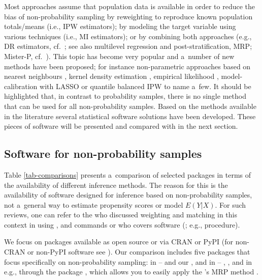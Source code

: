 \documentclass[
]{jss}
\begin{document}
Most approaches assume that population data is available in order to
reduce the bias of non-probability sampling by reweighting to reproduce
known population totals/means (i.e., IPW estimators); by modeling the
target variable using various techniques (i.e., MI estimators); or by
combining both approaches (e.g., DR estimators,
cf.~\citet{chen2020doubly}; see also multilevel regression and
post-stratification, MRP; Mister-P,
cf.~\citet{gelman1997poststratification}). This topic has become very
popular and a~number of new methods have been proposed; for instance
non-parametric approaches based on nearest neighbours
\citep{yang2021integration}, kernel density estimation
\citep{chen_nonparametric_2022}, empirical likelihood
\citep{kim2023empirical}, model-calibration with LASSO \citep{chen2018}
or quantile balanced IPW \citep{beresewicz2025} to name a~few. It should
be highlighted that, in contrast to probability samples, there is no
single method that can be used for all non-probability samples. Based on
the methods available in the literature several statistical software
solutions have been developed. These pieces of software will be
presented and compared with  \citep{nonprobsvy} in the
next section.

\subsection{Software for non-probability samples}\label{sec-software}

Table \ref{tab-comparisons} presents a~comparison of selected packages
in terms of the availability of different inference methods. The reason
for this is the availability of software designed for inference based on
non-probability samples, not a~general way to estimate propensity scores
or model \(E(Y|X)\). For such reviews, one can refer to the
\citet[Chapter 6]{valliant2018survey} who discussed weighting and
matching in this context in  \citep{Stata2025} using
,  and  commands or
\citet[e.g., Chapter 8]{lohr2021sas} who covers  software
(\citet{sas94}; e.g.,  procedure).

We focus on packages available as open source or via CRAN or PyPI (for
non-CRAN or non-PyPI software see \citet{cobo2024software}). Our
comparison includes five packages that focus specifically on
non-probability sampling: in  -- 
\citep{NonProbEst} and our , and in  --
 \citep{sarig2023balancepythonpackage}, 
\citep{castro2024inps}, and in  \citep{carpenter2017stan}
e.g., through the  package , which allows you
to easily apply the 's MRP method \citep{rstanarm}.
\end{document}
